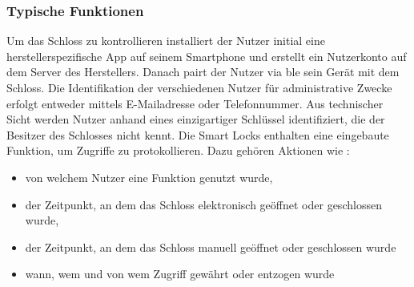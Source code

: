     \subsubsection{Typische Funktionen}
    \label{sec:sota_smart_locks_func}
		Um das Schloss zu kontrollieren installiert der Nutzer initial eine herstellerspezifische App auf seinem Smartphone und erstellt ein Nutzerkonto auf dem Server des Herstellers. 
		Danach pairt der Nutzer via \gls{ble} sein Gerät mit dem Schloss.\cite{Ho2016} 
		Die Identifikation der verschiedenen Nutzer für administrative Zwecke erfolgt entweder mittels E-Mailadresse oder Telefonnummer. 
		Aus technischer Sicht werden Nutzer anhand eines einzigartiger Schlüssel identifiziert, die der Besitzer des Schlosses nicht kennt.\cite{Fuller2017} 
		Die Smart Locks enthalten eine eingebaute Funktion, um Zugriffe zu protokollieren. 
		Dazu gehören Aktionen wie \cite{Fuller2017}:
		\begin{itemize}[noitemsep]
			\item von welchem Nutzer eine Funktion genutzt wurde, 
			\item der Zeitpunkt, an dem das Schloss elektronisch geöffnet oder geschlossen wurde,
			\item der Zeitpunkt, an dem das Schloss manuell geöffnet oder geschlossen wurde
			\item wann, wem und von wem Zugriff gewährt oder entzogen wurde
		\end{itemize}
	
